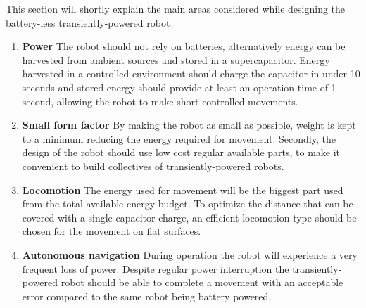 This section will shortly explain the main areas considered while designing the battery-less transiently-powered robot



\begin{enumerate}
\item \textbf{Power} The robot should not rely on batteries, alternatively energy can be harvested from ambient sources and stored in a supercapacitor. 
Energy harvested in a controlled environment should charge the capacitor in under 10 seconds and stored energy should provide at least an operation time of 1 second, allowing the robot to make short controlled movements.

\item \textbf{Small form factor} By making the robot as small as possible, weight is kept to a minimum reducing the energy required for movement.
Secondly, the design of the robot should use low cost regular available parts, to make it convenient to build collectives of transiently-powered robots.

\item \textbf{Locomotion}
The energy used for movement will be the biggest part used from the total available energy budget.
To optimize the distance that can be covered with a single capacitor charge, an efficient locomotion type should be chosen for the movement on flat surfaces.

\item \textbf{Autonomous navigation}
During operation the robot will experience a very frequent loss of power. 
Despite regular power interruption the transiently-powered robot should be able to complete a movement with an acceptable error compared to the same robot being battery powered. 

\end{enumerate}




